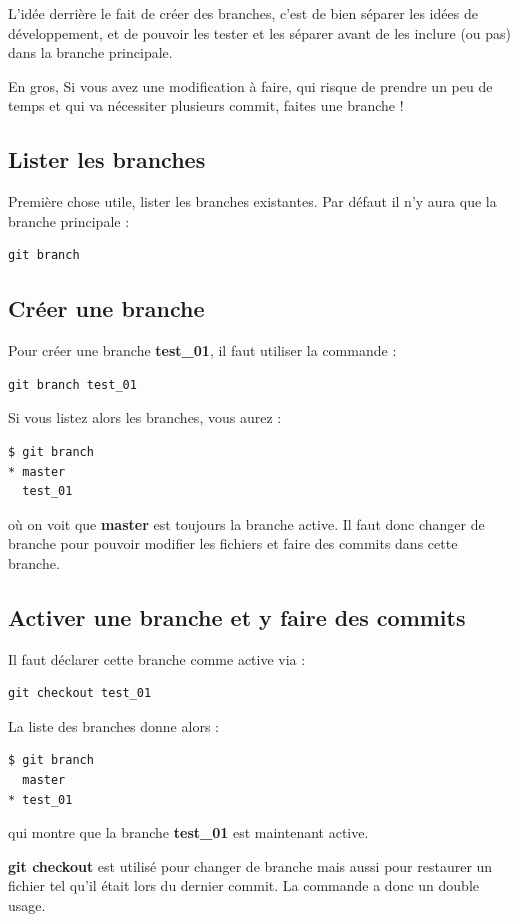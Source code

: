 \documentclass[a4paper,twoside]{article}
\begin{document}
L'idée derrière le fait de créer des branches, c'est de bien séparer les idées de développement, et de pouvoir les tester et les séparer avant de les inclure (ou pas) dans la branche principale. 

\begin{important}
En gros, Si vous avez une modification à faire, qui risque de prendre un peu de temps et qui va nécessiter plusieurs commit, faites une branche !
\end{important}


\subsection{Lister les branches}
Première chose utile, lister les branches existantes. Par défaut il n'y aura que la branche principale : 
\begin{verbatim}
git branch
\end{verbatim}

\subsection{Créer une branche}
Pour créer une branche \textbf{test\_01}, il faut utiliser la commande :
\begin{verbatim}
git branch test_01
\end{verbatim}

Si vous listez alors les branches, vous aurez :
\begin{verbatim}
$ git branch
* master
  test_01
\end{verbatim}
où on voit que \textbf{master} est toujours la branche active. Il faut donc changer de branche pour pouvoir modifier les fichiers et faire des commits dans cette branche.

\subsection{Activer une branche et y faire des commits}
Il faut déclarer cette branche comme active via :
\begin{verbatim}
git checkout test_01
\end{verbatim}

La liste des branches donne alors :
\begin{verbatim}
$ git branch
  master
* test_01
\end{verbatim}
qui montre que la branche \textbf{test\_01} est maintenant active.

\begin{remarque}
\textbf{git checkout} est utilisé pour changer de branche mais aussi pour restaurer un fichier tel qu'il était lors du dernier commit. La commande a donc un double usage.
\end{remarque}
\end{document}
